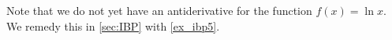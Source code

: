 Note that we do not yet have an antiderivative for the function $f(x)=\ln x$. We remedy this in \autoref{sec:IBP} with \autoref{ex_ibp5}.
%
%

